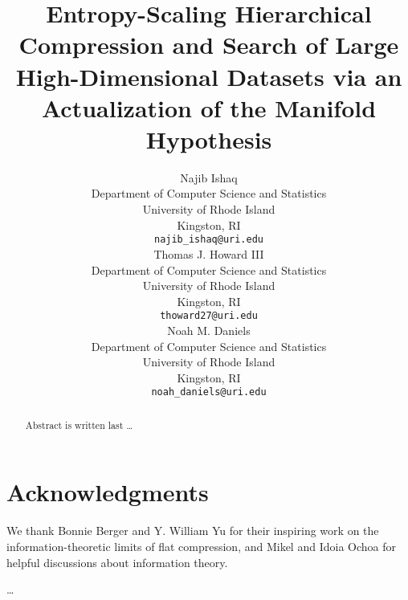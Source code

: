 \documentclass{article}
\title{Entropy-Scaling Hierarchical Compression and Search of Large High-Dimensional Datasets via an Actualization of the Manifold Hypothesis}
\author{
    Najib Ishaq \\
    Department of Computer Science and Statistics\\
    University of Rhode Island \\
    Kingston, RI \\
    \texttt{najib\_ishaq@uri.edu} \\
    \And
    Thomas J. Howard III \\
    Department of Computer Science and Statistics\\
    University of Rhode Island\\
    Kingston, RI\\
    \texttt{thoward27@uri.edu} \\
    \AND
    Noah M. Daniels \\
    Department of Computer Science and Statistics\\
    University of Rhode Island\\
    Kingston, RI\\
    \texttt{noah\_daniels@uri.edu} \\
}
\date{}
\begin{document}
    \maketitle
    \begin{abstract}
        Abstract is written last \dots
    \end{abstract}

    
    
    
    
    
    

    \section*{Acknowledgments}
    We thank Bonnie Berger and Y. William Yu for their inspiring work on the information-theoretic limits of flat compression, and Mikel and Idoia Ochoa for helpful discussions about information theory.

    \dots

    \FloatBarrier
      
    
\end{document}
